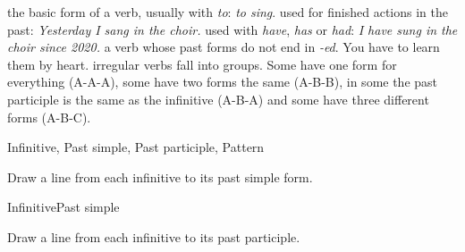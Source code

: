 \documentclass[11pt]{article}
\begin{document}

\begin{keyterms}
    {the basic form of a verb, usually with \textit{to}:
     \textit{to sing}.}
    {used for finished actions in the past:
     \textit{Yesterday I sang in the choir.}}
    {used with \textit{have}, \textit{has} or \textit{had}:
     \textit{I have sung in the choir since 2020.}}
    {a verb whose past forms do not end in \textit{-ed}.
     You have to learn them by heart.}
    {irregular verbs fall into groups. Some have one form for everything
     (A-A-A), some have two forms the same (A-B-B), in some the past
     participle is the same as the infinitive (A-B-A) and some have three different forms (A-B-C).}

  \begin{formtable}{Infinitive, Past simple, Past participle, Pattern}
  \end{formtable}
\end{keyterms}

\clearpage


%
  {Draw a line from each infinitive to its past simple form.}

\begin{matching}[match-sep=0.9cm]{Infinitive}{Past simple}
\end{matching}

%
  {Draw a line from each infinitive to its past participle.}
\end{document}

